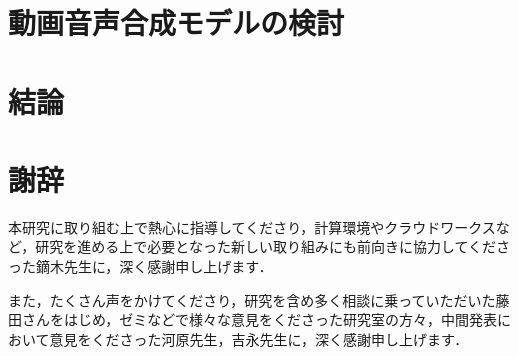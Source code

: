 \documentclass[12pt]{jarticle}
\numberwithin{equation}{section}    %
\numberwithin{figure}{section}      %
\numberwithin{table}{section}      %
\begin{document}
\clearpage

\section{動画音声合成モデルの検討}





\clearpage

\section{結論}

\clearpage

\section*{謝辞}
本研究に取り組む上で熱心に指導してくださり，計算環境やクラウドワークスなど，研究を進める上で必要となった新しい取り組みにも前向きに協力してくださった鏑木先生に，深く感謝申し上げます．

また，たくさん声をかけてくださり，研究を含め多く相談に乗っていただいた藤田さんをはじめ，ゼミなどで様々な意見をくださった研究室の方々，中間発表において意見をくださった河原先生，吉永先生に，深く感謝申し上げます．

\clearpage



\end{document}
